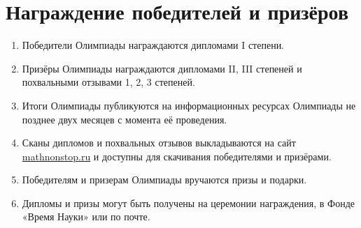 \documentclass[a4paper,12pt]{article}
\newcommand{\surl}[1]{{\small\url{#1}}}
\begin{document}
\section{Награждение победителей и призёров}

\begin{enumerate}
	\item Победители Олимпиады награждаются дипломами I степени.
	\item Призёры Олимпиады награждаются дипломами II, III степеней и похвальными отзывами 1, 2, 3 степеней.
	\item Итоги Олимпиады публикуются на информационных ресурсах Олимпиады не позднее двух месяцев с момента её проведения.
	\item Сканы дипломов и похвальных отзывов выкладываются на сайт \surl{mathnonstop.ru} и доступны для скачивания победителями и призёрами.
	\item Победителям и призерам Олимпиады вручаются призы и подарки.
	\item Дипломы и призы могут быть получены на церемонии награждения, в Фонде «Время Науки» или по почте.
\end{enumerate}
\end{document}
